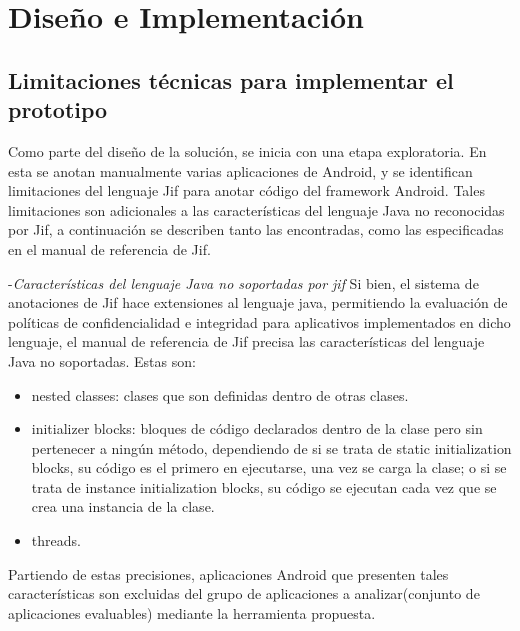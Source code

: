 \label{ch:desing}
\chapter{Diseño e Implementación}

\section{Limitaciones técnicas para implementar el prototipo}
Como parte del diseño de la solución, se inicia con una etapa exploratoria. En
esta se anotan manualmente varias aplicaciones de Android, y se identifican
limitaciones del lenguaje Jif para anotar código del framework Android.
Tales limitaciones son adicionales a las características del lenguaje Java no
reconocidas por Jif, a continuación se describen tanto las encontradas, como las
especificadas en el manual de referencia de Jif.

-\textit{Características del lenguaje Java no soportadas por jif}\newline
Si bien, el sistema de anotaciones de Jif hace extensiones al lenguaje java,
permitiendo la evaluación de políticas de confidencialidad e integridad para
aplicativos implementados en dicho lenguaje, el manual de referencia de Jif
precisa las características del lenguaje Java no soportadas\cite{jifRef}. Estas
son:
\begin{itemize}
  \item nested classes: clases que son definidas dentro de otras clases.
  \item initializer blocks: bloques de código declarados dentro de la clase pero
  sin pertenecer a ningún método, dependiendo de si se trata de static
  initialization blocks, su código es el primero en ejecutarse, una vez se
  carga la clase; o si se trata de instance initialization blocks, su código se
  ejecutan cada vez que se crea una instancia de la clase.
\item threads.
\end{itemize} 
Partiendo de estas precisiones, aplicaciones Android que presenten tales
características son excluidas del grupo de aplicaciones a analizar(conjunto de
aplicaciones evaluables) mediante la herramienta propuesta.


